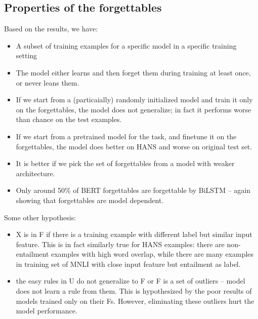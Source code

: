\subsection{Properties of the forgettables}
Based on the results, we have:

\begin{itemize}
    \item A subset of training examples for a specific model 
     in a specific training setting
     \item The model either learns and then forget them during training at least once, or never leans them.
     \item If we start from a (particaially) randomly initialized model and train it only on the forgettables, the model does not generalize; in fact it performs worse than chance on the test examples.
    \item If we start from a pretrained model for the task, and finetune it on
    the forgettables, the model does better on HANS and worse on original test set.
    \item It is better if we pick the set of forgettables from a model with weaker architecture.
    \item Only around 50\% of BERT forgettables are forgettable by BiLSTM -- again showing that forgettables are model dependent. 
    
\end{itemize}

Some other hypothesis:
\begin{itemize}
    \item X is in F if there is a training example with different label but similar input feature. This is in fact
    similarly true for HANS examples: there are non-entailment examples with high word overlap, while there are many 
    examples in training set of MNLI with close input feature but entailment as label.
    \item the easy rules in U do not generalize to F or F is a set of outliers -- model does not learn a rule from them. 
    This is hypothesized by the poor results of models trained only on their Fs. However, eliminating these outliers hurt the model
    performance. 
    
\end{itemize}

\iffalse
\subsection{Nearest neighbors}
We take the embedding of CLS in BERT as the representation of an example. 
In BERT models, this embedding is fed to a linear classifier and optimized by cross entropy loss. 
Here, we find and look into the k-NNs of training examples for understanding what model is actually learning. 
\fi


